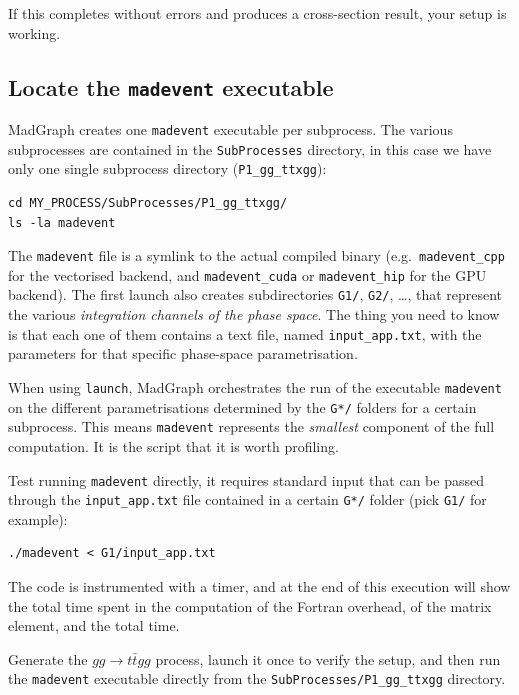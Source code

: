 \documentclass[11pt,a4paper]{article}
\begin{document}
If this completes without errors and produces a cross-section result, your setup is working.

\subsection{Locate the \texttt{madevent} executable}

MadGraph creates one \texttt{madevent} executable per subprocess.
The various subprocesses are contained in the \texttt{SubProcesses} directory, in this case we have only one single subprocess directory (\texttt{P1\_gg\_ttxgg}):

\begin{lstlisting}[style=bashstyle]
cd MY_PROCESS/SubProcesses/P1_gg_ttxgg/
ls -la madevent
\end{lstlisting}

The \texttt{madevent} file is a symlink to the actual compiled binary (e.g.\ \texttt{madevent\_cpp} for the vectorised backend, and \texttt{madevent\_cuda} or \texttt{madevent\_hip} for the GPU backend).
The first launch also creates subdirectories \texttt{G1/}, \texttt{G2/}, \ldots, that represent the various \emph{integration channels of the phase space}.
The thing you need to know is that each one of them contains a text file, named \texttt{input\_app.txt}, with the parameters for that specific phase-space parametrisation.

When using \texttt{launch}, MadGraph orchestrates the run of the executable \texttt{madevent} on the different parametrisations determined by the \texttt{G*/} folders for a certain subprocess.
This means \texttt{madevent} represents the \emph{smallest} component of the full computation.
It is the script that it is worth profiling.

Test running \texttt{madevent} directly, it requires standard input that can be passed through the \texttt{input\_app.txt} file contained in a certain \texttt{G*/} folder (pick \texttt{G1/} for example):
\begin{lstlisting}[style=bashstyle]
./madevent < G1/input_app.txt
\end{lstlisting}

The code is instrumented with a timer, and at the end of this execution will show the total time spent in the computation of the Fortran overhead, of the matrix element, and the total time.

\begin{exercisebox}[Exercise 2]
Generate the $gg \to t\bar{t}gg$ process, launch it once to verify the setup, and then run the \texttt{madevent} executable directly from the \texttt{SubProcesses/P1\_gg\_ttxgg} directory.
\end{exercisebox}
\end{document}

